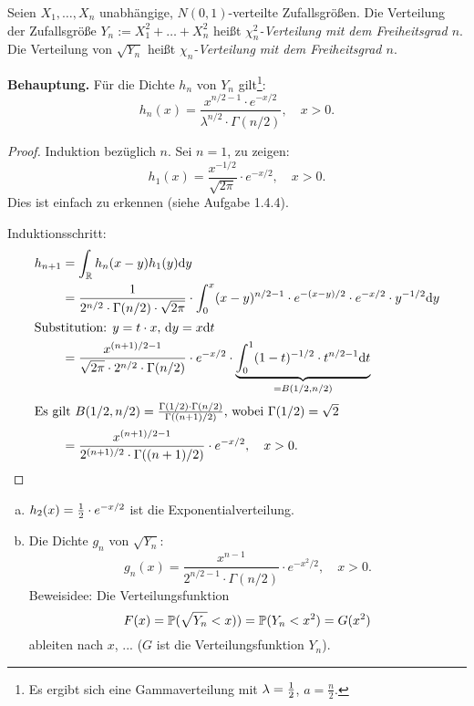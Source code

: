\begin{prgp}
  Seien $X_1, \ldots, X_n$ unabhängige, $N(0,1)$-verteilte Zufallsgrößen. Die
  Verteilung der Zufallsgröße $Y_n := X_1^2 + \ldots + X_n^2$ heißt
  \emph{$\chi_n^2$-Verteilung mit dem Freiheitsgrad $n$}. Die Verteilung von
  $\sqrt{Y_n}$ heißt \emph{$\chi_n$-Verteilung mit dem Freiheitsgrad $n$}.

  \textbf{Behauptung.} Für die Dichte $h_n$ von $Y_n$ gilt\footnote{%
    Es ergibt sich eine Gammaverteilung mit $\lambda = \frac{1}{2}$, $a = \frac{n}{2}$.
  }:
  \[ h_n(x) = \frac{x^{n/2 - 1} \cdot e^{-x/2}}{\lambda^{n/2} \cdot \Gamma( n/2
      )}, \quad x > 0. \]

  \begin{proof}
    Induktion bezüglich $n$. Sei $n = 1$, zu zeigen:
    \[ h_1(x) = \frac{x^{-1/2}}{\sqrt{2 \pi}} \cdot e^{-x/2}, \quad x > 0. \]
    Dies ist einfach zu erkennen (siehe Aufgabe 1.4.4).

    Induktionsschritt:
    \begin{align*}
      h_{n+1}
      &= \int_{\mathbb{R}} h_n(x-y) h_1(y) \mathrm{d} y \\
      &= \frac{1}{2^{n/2} \cdot \Gamma( n/2 ) \cdot \sqrt{2 \pi}} \cdot
        \int_0^x (x-y)^{n/2-1} \cdot e^{-(x-y)/2} \cdot e^{-x/2} \cdot y^{-1/2} \mathrm{d} y \\
      \intertext{Substitution: $y = t \cdot x$, $\mathrm{d} y = x \mathrm{d} t$}
      &= \frac{x^{(n+1)/2-1}}{\sqrt{2\pi} \cdot 2^{n/2} \cdot \Gamma(n/2)} \cdot e^{-x/2} \cdot
        \underbrace{ \int_0^1 (1-t)^{-1/2} \cdot t^{n/2-1} \mathrm{d} t}_{=B(1/2, n/2)} \\
      \intertext{Es gilt $B(1/2, n/2) = \frac{\Gamma(1/2) \cdot
      \Gamma(n/2)}{\Gamma((n+1)/2)}$, wobei $\Gamma(1/2) = \sqrt{2}$}
      &= \frac{x^{(n+1)/2-1}}{2^{(n+1)/2} \cdot \Gamma((n+1)/2)} \cdot e^{-x/2}, \quad x > 0. \qedhere
    \end{align*}
  \end{proof}
\end{prgp}

\begin{rmrk*}
  \begin{enumerate}[a)]
  \item $h_2(x) = \frac{1}{2} \cdot e^{-x/2}$ ist die Exponentialverteilung.
  \item Die Dichte $g_n$ von $\sqrt{Y_n}$:
    \[ g_n(x) = \frac{x^{n-1}}{2^{n/2-1} \cdot \Gamma(n/2)} \cdot e^{-x^2/2},
      \quad x > 0. \]
    Beweisidee: Die Verteilungsfunktion
    \[ F(x) = \mathbb{P}( \sqrt{Y_n} < x )) = \mathbb{P}(Y_n < x^2) = G(x^2) \]
    ableiten nach $x$, ... ($G$ ist die Verteilungsfunktion $Y_n$).
  \end{enumerate}
\end{rmrk*}

